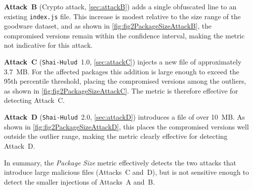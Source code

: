 \textbf{Attack~B} (Crypto attack, \cref{sec:attackB}) adds a single obfuscated line to an existing \texttt{index.js} file.
This increase is modest relative to the size range of the goodware dataset, 
and as shown in \cref{fig:fig2PackageSizeAttackB}, the compromised versions remain within the confidence interval, 
making the metric not indicative for this attack.

\textbf{Attack~C} (\texttt{Shai-Hulud}~1.0, \cref{sec:attackC}) injects a new file of approximately 3.7~MB.
For the affected packages this addition is large enough to exceed the 95th percentile threshold,
placing the compromised versions among the outliers, as shown in \cref{fig:fig2PackageSizeAttackC}.
The metric is therefore effective for detecting Attack~C.

\textbf{Attack~D} (\texttt{Shai-Hulud}~2.0, \cref{sec:attackD}) introduces a file of over 10~MB.
As shown in \cref{fig:fig2PackageSizeAttackD}, this places the compromised versions well outside the outlier range,
making the metric clearly effective for detecting Attack~D.

In summary, the \emph{Package Size} metric effectively detects the two attacks that introduce large malicious files (Attacks~C and~D),
but is not sensitive enough to detect the smaller injections of Attacks~A and~B.